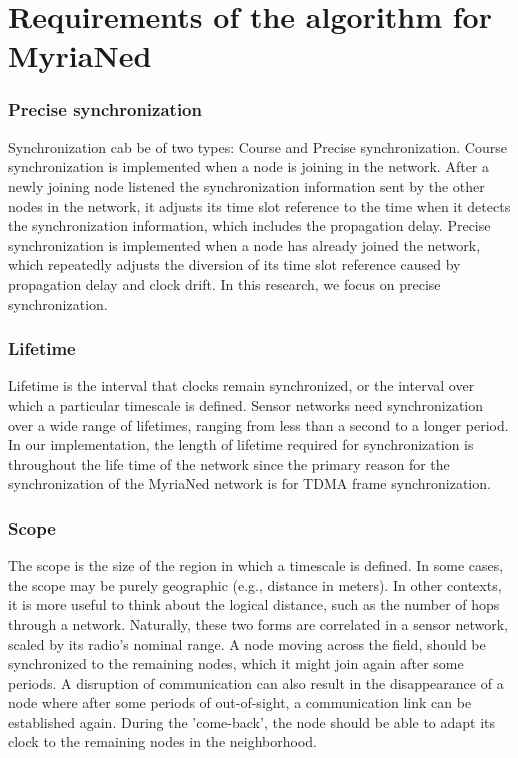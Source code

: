 \documentclass[a4paper,10pt]{report}
\begin{document}
\section{\textbf{Requirements of the algorithm for MyriaNed}}
\subsubsection{\textbf{Precise synchronization}}
Synchronization cab be of two types: Course and Precise synchronization. Course synchronization is implemented when a node is joining in the network. After a newly joining node listened the synchronization information sent by the other nodes in the network, it adjusts its time slot reference to the time when it detects the synchronization information, which includes the propagation delay. Precise synchronization is implemented when a node has already joined the network, which repeatedly adjusts the diversion of its time slot reference caused by propagation delay and clock drift. In this research, we focus on precise synchronization.
\subsubsection{\textbf{Lifetime}} Lifetime is the interval that clocks remain synchronized, or the interval over which a particular
timescale is defined. Sensor networks need synchronization over a wide range of lifetimes, ranging from less than a second to a longer period. In our implementation, the length of lifetime required for synchronization is throughout the life time of the network since
the primary reason for the synchronization of the MyriaNed network is for TDMA frame synchronization.
\subsubsection{\textbf{Scope}} The scope is the size of the region in which a timescale is defined. In some cases, the scope may be purely geographic (e.g., distance in meters). In other contexts, it is more useful to think about the logical distance, such as the number of hops through a network. Naturally, these two forms are correlated in a sensor network, scaled by its radio's nominal range. A node moving across the field, should be synchronized to the remaining nodes, which it might join again after some periods. A disruption of communication can also result in the disappearance of a node where after some periods of out-of-sight,
a communication link can be established again. During the
'come-back', the node should be able to adapt its clock to the
remaining nodes in the neighborhood.
\end{document}
